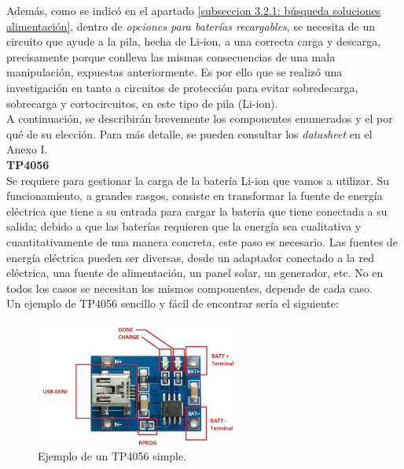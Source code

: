 \documentclass[12pt]{article}
\begin{document}
	\pagebreak
	
	\noindent Además, como se indicó en el apartado \ref{subseccion 3.2.1: búsqueda soluciones alimentación}, dentro de \textit{opciones para baterías recargables}, se necesita de un circuito que ayude a la pila, hecha de Li-ion, a una correcta carga y descarga, precisamente porque conlleva las mismas consecuencias de una mala manipulación, expuestas anteriormente. Es por ello que se realizó una investigación en tanto a circuitos de protección para evitar sobredecarga, sobrecarga y cortocircuitos, en este tipo de pila (Li-ion). \\
	
	\noindent A continuación, se describirán brevemente los componentes enumerados y el por qué de su elección. Para más detalle, se pueden consultar los \textit{datasheet} en el Anexo I. \\
	
	\noindent \textbf{TP4056} \\
	
	\noindent Se requiere para gestionar la carga de la batería Li-ion que vamos a utilizar.  Su funcionamiento, a grandes rasgos, consiste en transformar la fuente de energía eléctrica que tiene a su entrada para cargar la batería que tiene conectada a su salida; debido a que las baterías requieren que la energía sea cualitativa y cuantitativamente de una manera concreta, este paso es necesario. Las fuentes de energía eléctrica pueden ser diversas, desde un adaptador conectado a la red eléctrica, una fuente de alimentación, un panel solar, un generador, etc. No en todos los casos se necesitan los mismos componentes, depende de cada caso.\\
	
	\noindent Un ejemplo de TP4056 sencillo y fácil de encontrar sería el siguiente:  \\
		
	\begin{figure}[h]
		\begin{center}
			\includegraphics[width=0.6\textwidth]{img/tp4056_withoutBoost.png}
			\caption{Ejemplo de un TP4056 simple.}
			\label{TP4056 sin boost}
		\end{center}
	\end{figure}
	
\end{document}
